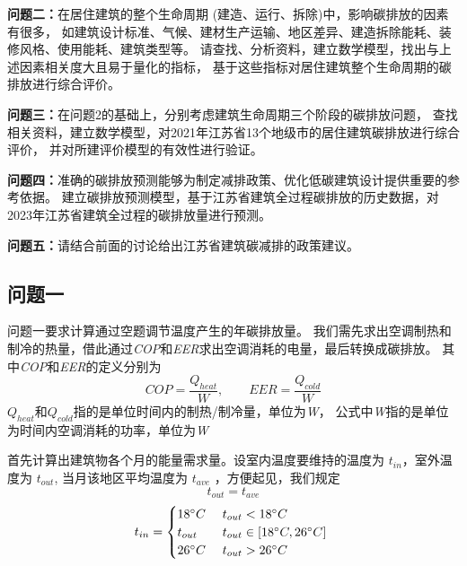 \documentclass[a4paper, 12pt]{article}
\numberwithin{equation}{section}
\begin{document}
            \textbf{问题二：}在居住建筑的整个生命周期 (建造、运行、拆除)中，影响碳排放的因素有很多，
            如建筑设计标准、气候、建材生产运输、地区差异、建造拆除能耗、装修风格、使用能耗、建筑类型等。
            请查找、分析资料，建立数学模型，找出与上述因素相关度大且易于量化的指标，
            基于这些指标对居住建筑整个生命周期的碳排放进行综合评价。

            \textbf{问题三：}在问题2的基础上，分别考虑建筑生命周期三个阶段的碳排放问题，
            查找相关资料，建立数学模型，对2021年江苏省13个地级市的居住建筑碳排放进行综合评价，
            并对所建评价模型的有效性进行验证。

            \textbf{问题四：}准确的碳排放预测能够为制定减排政策、优化低碳建筑设计提供重要的参考依据。
            建立碳排放预测模型，基于江苏省建筑全过程碳排放的历史数据，对2023年江苏省建筑全过程的碳排放量进行预测。

            \textbf{问题五：}请结合前面的讨论给出江苏省建筑碳减排的政策建议。


    {}
        \subsection{问题一}
            问题一要求计算通过空题调节温度产生的年碳排放量。
            我们需先求出空调制热和制冷的热量，借此通过\textit{COP}和\textit{EER}求出空调消耗的电量，最后转换成碳排放。
            其中\textit{COP}和\textit{EER}的定义分别为
            \begin{equation}
                COP = \frac{Q_{heat}}{W},\hspace{2em} EER = \frac{Q_{cold}}{W}
            \end{equation}
            $ Q_{heat} 和 Q_{cold} $指的是单位时间内的制热/制冷量，单位为\textit{W}，
            公式中\textit{W}指的是单位为时间内空调消耗的功率，单位为\textit{W}

            首先计算出建筑物各个月的能量需求量。设室内温度要维持的温度为 $ t_{in} $，室外温度为 $ t_{out} $,
            当月该地区平均温度为 $ t_{ave} $ ，方便起见，我们规定
            \begin{equation*}
                t_{out} = t_{ave}
            \end{equation*}
            \begin{equation*}
                t_{in} =
                \begin{cases}
                    18 ^{\circ}C & \text{ $ t_{out} < 18 ^{\circ}C $ } \\
                    t_{out} & \text{ $ t_{out} \in [18 ^{\circ}C, 26 ^{\circ}C] $ } \\
                    26 ^{\circ}C & \text{ $ t_{out} > 26 ^{\circ}C $}
                \end{cases}
            \end{equation*}
\end{document}
